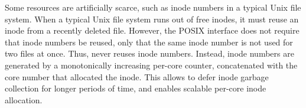 Some resources are artificially scarce, such as inode numbers in a typical
Unix file system.  When a typical Unix file system runs out of free
inodes, it must reuse an inode from a recently deleted file.  However,
the POSIX interface does not require that inode numbers be reused, only
that the same inode number is not used for two files at once.  Thus,
\fs never reuses inode numbers.  Instead, inode numbers are
generated by a monotonically increasing per-core counter, concatenated
with the core number that allocated the inode.  This allows \fs to defer
inode garbage collection for longer periods of time, and enables scalable
per-core inode allocation.







